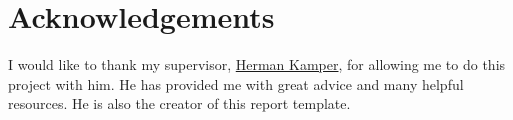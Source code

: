 \chapter*{Acknowledgements}
\makeatletter{}\makeatother

I would like to thank my supervisor, \href{https://www.kamperh.com/}{Herman Kamper}, for allowing me to do this project with him.
He has provided me with great advice and many helpful resources. He is also the creator of this report template.